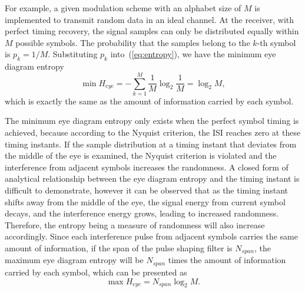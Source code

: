 \documentclass[12pt, draftclsnofoot, onecolumn]{IEEEtran}
\begin{document}
For example, a given modulation scheme with an alphabet size of \(M\) is implemented to transmit random data in an ideal channel. 
At the receiver, with perfect timing recovery, the signal samples can only be distributed equally within \(M\) possible symbols.
The probability that the samples belong to the $k$-th symbol is \(p_k=1/M\).
Substituting \(p_k\) into~(\ref{eq:entropy}), we have the minimum eye diagram entropy
\begin{equation}
\min{H_{eye}} =  - \sum\limits_{k = 1}^M {{\frac{1}{M}}\log_2 {\frac{1}{M}}}=\log_2 {M},
\label{eq:entropy_mid}
\end{equation}
which is exactly the same as the amount of information carried by each symbol.


The minimum eye diagram entropy only exists when the perfect symbol timing is achieved, because according to the Nyquist criterion, the ISI reaches zero at these timing instants.
If the sample distribution at a timing instant that deviates from the middle of the eye is examined, 
the Nyquist criterion is violated and the
interference from adjacent symbols increases the randomness.
A closed form of analytical relationship between the eye diagram entropy and the timing instant is difficult to demonstrate, however it can be observed that 
as the timing instant shifts away from the middle of the eye, the signal energy from current symbol decays, and the interference energy grows, leading to increased randomness.
% 
% 
Therefore, the entropy being a measure of randomness will also increase accordingly.
Since each interference pulse from adjacent symbols carries the same amount of information, 
if the span of the pulse shaping filter is \(N_{span}\), 
the maximum eye diagram entropy will be \(N_{span}\) times the amount of information carried by each symbol, which can be presented as
% 
% 
\begin{equation}
\max{H_{eye}} =  N_{span}\log_2 {M}.
\label{eq:entropy_neb}
\end{equation}
\end{document}
